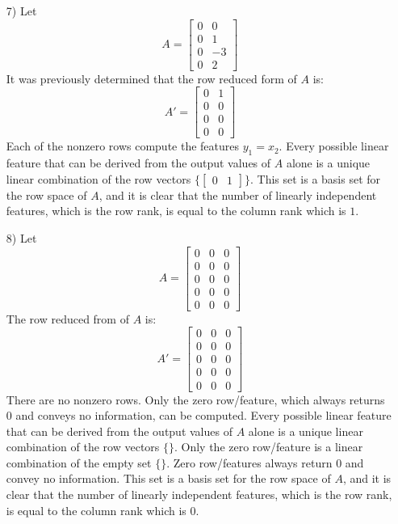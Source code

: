 \documentclass{article}
\begin{document}
\begin{itemize}
\item[7)] Let \[A = \begin{bmatrix}
0 &  0 \\
0 &  1 \\
0 & -3 \\ 
0 &  2
\end{bmatrix}\]
It was previously determined that the row reduced form of \(A\) is: 
\[A' = \begin{bmatrix}
0 & 1 \\
0 & 0 \\
0 & 0 \\ 
0 & 0
\end{bmatrix}\] 
Each of the nonzero rows compute the features \(y_1 = x_2\). Every possible linear feature that can be derived from the output values of \(A\) alone is a unique linear combination of the row vectors \(\{\begin{bmatrix} 0 & 1 \end{bmatrix}\}\). This set is a basis set for the row space of \(A\), and it is clear that the number of linearly independent features, which is the row rank, is equal to the column rank which is \(1\).
\item[8)] Let \[A = \begin{bmatrix}
0 & 0 & 0 \\ 
0 & 0 & 0 \\ 
0 & 0 & 0 \\ 
0 & 0 & 0 \\ 
0 & 0 & 0 
\end{bmatrix}\]
The row reduced from of \(A\) is: 
\[A' = \begin{bmatrix}
0 & 0 & 0 \\ 
0 & 0 & 0 \\ 
0 & 0 & 0 \\ 
0 & 0 & 0 \\ 
0 & 0 & 0 
\end{bmatrix}\]
There are no nonzero rows. Only the zero row/feature, which always returns \(0\) and conveys no information, can be computed. Every possible linear feature that can be derived from the output values of \(A\) alone is a unique linear combination of the row vectors \(\{\}\). Only the zero row/feature is a linear combination of the empty set \(\{\}\). Zero row/features always return \(0\) and convey no information. This set is a basis set for the row space of \(A\), and it is clear that the number of linearly independent features, which is the row rank, is equal to the column rank which is \(0\).
\end{itemize}
\end{document}
